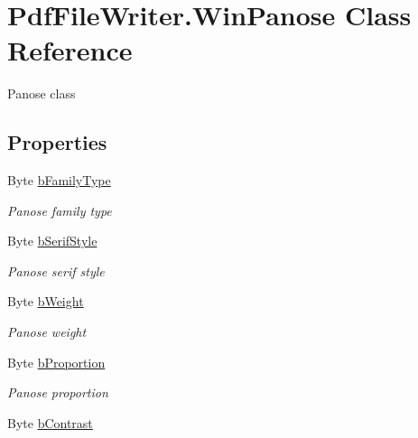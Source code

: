 \hypertarget{class_pdf_file_writer_1_1_win_panose}{}\section{Pdf\+File\+Writer.\+Win\+Panose Class Reference}
\label{class_pdf_file_writer_1_1_win_panose}


Panose class  


\subsection*{Properties}
\begin{DoxyCompactItemize}
\item 
Byte \hyperlink{class_pdf_file_writer_1_1_win_panose_a0207f565adf2e75a73efd666e471e449}{b\+Family\+Type}
\begin{DoxyCompactList}\small\item\em Panose family type \end{DoxyCompactList}\item 
Byte \hyperlink{class_pdf_file_writer_1_1_win_panose_ae57232a6e04df7d5b74957444ce3a414}{b\+Serif\+Style}
\begin{DoxyCompactList}\small\item\em Panose serif style \end{DoxyCompactList}\item 
Byte \hyperlink{class_pdf_file_writer_1_1_win_panose_a37225f24bcba664e0971f1c78e3d47f3}{b\+Weight}
\begin{DoxyCompactList}\small\item\em Panose weight \end{DoxyCompactList}\item 
Byte \hyperlink{class_pdf_file_writer_1_1_win_panose_aac3885eca66527b4285c3c29c8608b98}{b\+Proportion}
\begin{DoxyCompactList}\small\item\em Panose proportion \end{DoxyCompactList}\item 
Byte \hyperlink{class_pdf_file_writer_1_1_win_panose_aa973e8c30298b049d131f6a0ede7b542}{b\+Contrast}

\end{DoxyCompactItemize}
